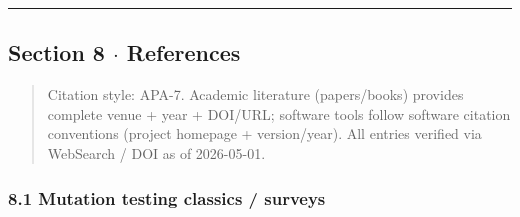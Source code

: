 \documentclass[review,12pt,authoryear]{elsarticle}
\begin{document}
\begin{center}\rule{0.5\linewidth}{0.5pt}\end{center}

\subsection{Section 8 $\cdot$ References}\label{section-8-references}

\begin{quote}
Citation style: APA-7. Academic literature (papers/books) provides
complete venue + year + DOI/URL; software tools follow software citation
conventions (project homepage + version/year). All entries verified via
WebSearch / DOI as of 2026-05-01.
\end{quote}

\subsubsection{8.1 Mutation testing classics /
surveys}\label{mutation-testing-classics-surveys}
\end{document}
